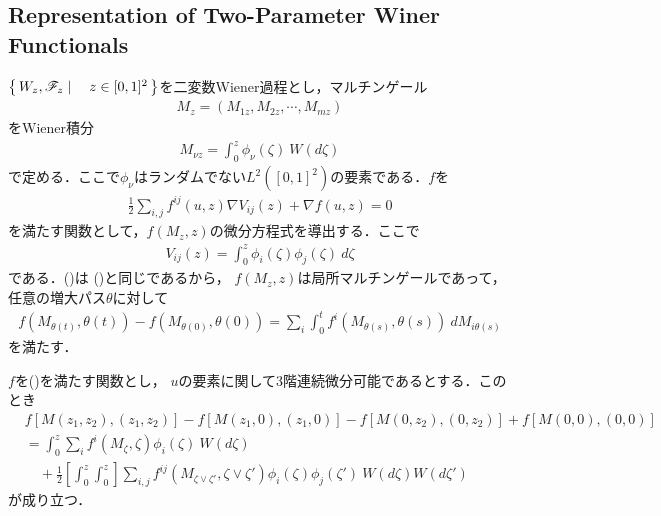 \subsection{Representation of Two-Parameter Winer Functionals}
	$\left\{\, W_{z},\mathscr{F}_{z} \mid \quad z \in [0,1]^{2}\, \right\}$を二変数Wiener過程とし，マルチンゲール
	\begin{align}
		M_{z} = \left(M_{1z}, M_{2z}, \cdots, M_{mz}\right)
	\end{align}
	をWiener積分
	\begin{align}
		M_{\nu z} = \int_{0}^{z} \phi_{\nu}(\zeta)\ W(d\zeta)
	\end{align}
	で定める．ここで$\phi_{\nu}$はランダムでない$L^{2}([0,1]^{2})$の要素である．$f$を
	\begin{align}
		\frac{1}{2} \sum_{i,j} f^{ij}(u,z) \nabla V_{ij}(z) + \nabla f(u,z) = 0
		\label{fom:Representation_of_Two_Parameter_Winer_Functionals_1}
	\end{align}
	を満たす関数として，$f(M_{z},z)$の微分方程式を導出する．ここで
	\begin{align}
		V_{ij}(z) = \int_{0}^{z} \phi_{i}(\zeta) \phi_{j}(\zeta)\ d\zeta
	\end{align}
	である．()は
	()と同じであるから，
	$f(M_{z},z)$は局所マルチンゲールであって，任意の増大パス$\theta$に対して
	\begin{align}
		f\left(M_{\theta(t)},\theta(t)\right) - f\left(M_{\theta(0)},\theta(0)\right)
		= \sum_{i} \int_{0}^{t} f^{i}\left(M_{\theta(s)},\theta(s)\right)\ dM_{i\theta(s)}
		\label{fom:Representation_of_Two_Parameter_Winer_Functionals_3}
	\end{align}
	を満たす．
	
	\begin{thm}
		$f$を()を満たす関数とし，
		$u$の要素に関して3階連続微分可能であるとする．このとき
		\begin{align}
			&f\left[M(z_{1},z_{2}),(z_{1},z_{2})\right] - f\left[M(z_{1},0),(z_{1},0)\right]
			- f\left[M(0,z_{2}),(0,z_{2})\right] + f\left[M(0,0),(0,0)\right] \\
			&= \int_{0}^{z} \sum_{i} f^{i}(M_{\zeta},\zeta) \phi_{i}(\zeta)\ W(d\zeta) \\
			&\quad + \frac{1}{2} \left[\int_{0}^{z} \int_{0}^{z}\right]
			\sum_{i,j} f^{ij}(M_{\zeta \vee \zeta'},\zeta \vee \zeta') \phi_{i}(\zeta) \phi_{j}(\zeta')\ W(d\zeta) W(d\zeta')
			\label{fom:Representation_of_Two_Parameter_Winer_Functionals_2}
		\end{align}
		が成り立つ．
	\end{thm}
	
